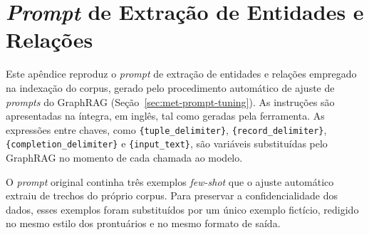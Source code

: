 \chapter{\texorpdfstring{\textit{Prompt}}{Prompt} de Extração de Entidades e Relações}\label{ap:prompt-indexacao}

Este apêndice reproduz o \textit{prompt} de extração de entidades e relações empregado na indexação do corpus, gerado pelo procedimento automático de ajuste de \textit{prompts} do GraphRAG (Seção~\ref{sec:met-prompt-tuning}). As instruções são apresentadas na íntegra, em inglês, tal como geradas pela ferramenta. As expressões entre chaves, como \texttt{\{tuple\_delimiter\}}, \texttt{\{record\_delimiter\}}, \texttt{\{completion\_delimiter\}} e \texttt{\{input\_text\}}, são variáveis substituídas pelo GraphRAG no momento de cada chamada ao modelo.

O \textit{prompt} original continha três exemplos \textit{few-shot} que o ajuste automático extraiu de trechos do próprio corpus. Para preservar a confidencialidade dos dados, esses exemplos foram substituídos por um único exemplo fictício, redigido no mesmo estilo dos prontuários e no mesmo formato de saída.

\begin{small}
\end{small}
